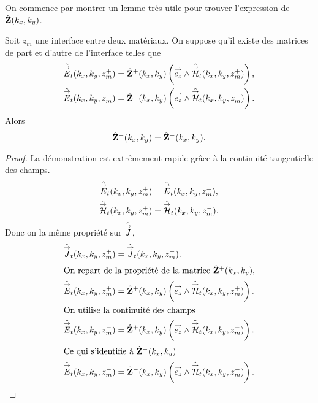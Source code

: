         On commence par montrer un lemme très utile pour trouver l'expression de \(\hat {\mathbf{Z}}(k_x,k_y)\).
        \begin{lemme}
          \label{lem:plan:continuite_impedance}
          Soit \(z_m\) une interface entre deux matériaux.
          On suppose qu'il existe des matrices de part et d'autre de l'interface telles que
          \begin{align*}
              \hat{{\overset{\rightarrow}{E}}}_t(k_x,k_y,z_m^+) &= \hat{\mathbf{Z}}^+(k_x,k_y) \left({\overset{\rightarrow}{e_z}} \wedge \hat{{\overset{\rightarrow}{\mathcal{H}}}}_t(k_x,k_y,z_m^+)\right),
              \\
              \hat{{\overset{\rightarrow}{E}}}_t(k_x,k_y,z_m^-) &= \hat{\mathbf{Z}}^-(k_x,k_y) \left({\overset{\rightarrow}{e_z}} \wedge \hat{{\overset{\rightarrow}{\mathcal{H}}}}_t(k_x,k_y,z_m^-)\right).
          \end{align*}
          Alors
          \begin{equation*}
          \hat {\mathbf{Z}}^+(k_x,k_y) = \hat {\mathbf{Z}}^-(k_x,k_y).
          \end{equation*}
        \end{lemme}


        \begin{proof}
          La démonstration est extrêmement rapide grâce à la continuité tangentielle des champs.
          \begin{align*}
            \hat{{\overset{\rightarrow}{E}}}_t(k_x,k_y,z_m^+) &= \hat{{\overset{\rightarrow}{E}}}_t(k_x,k_y,z_m^-),
            \\
            \hat{{\overset{\rightarrow}{\mathcal{H}}}}_t(k_x,k_y,z_m^+) &= \hat{{\overset{\rightarrow}{\mathcal{H}}}}_t(k_x,k_y,z_m^-).
          \end{align*}
          Donc on la même propriété sur \(\hat{{\overset{\rightarrow}{J}}}\),
          \begin{align*}                
            \hat{{\overset{\rightarrow}{J}}}_t(k_x,k_y,z_m^+) &= \hat{{\overset{\rightarrow}{J}}}_t(k_x,k_y,z_m^-).
            \\
            \intertext{On repart de la propriété de la matrice \(\hat{\mathbf{Z}}^+(k_x,k_y)\),}
            \hat{{\overset{\rightarrow}{E}}}_t(k_x,k_y,z_m^+) &= \hat{\mathbf{Z}}^+(k_x,k_y) \left({\overset{\rightarrow}{e_z}} \wedge \hat{{\overset{\rightarrow}{\mathcal{H}}}}_t(k_x,k_y,z_m^+)\right).
            \\
            \intertext{On utilise la continuité des champs}
            \hat{{\overset{\rightarrow}{E}}}_t(k_x,k_y,z_m^-) &= \hat{\mathbf{Z}}^+(k_x,k_y) \left({\overset{\rightarrow}{e_z}} \wedge \hat{{\overset{\rightarrow}{\mathcal{H}}}}_t(k_x,k_y,z_m^-)\right).
            \\
            \intertext{Ce qui s'identifie à \(\hat{\mathbf{Z}}^-(k_x,k_y)\)}
            \hat{{\overset{\rightarrow}{E}}}_t(k_x,k_y,z_m^-) &= \hat{\mathbf{Z}}^-(k_x,k_y) \left({\overset{\rightarrow}{e_z}} \wedge \hat{{\overset{\rightarrow}{\mathcal{H}}}}_t(k_x,k_y,z_m^-)\right).
          \end{align*}
        \end{proof}

